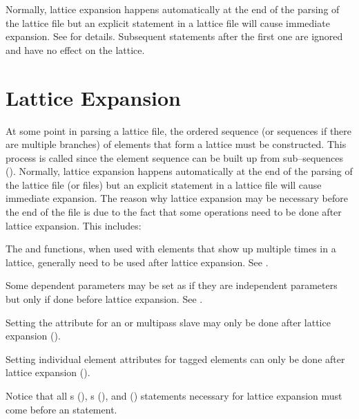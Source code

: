 {{{{{Normally, lattice expansion happens automatically at the end of the parsing of the lattice file but
an explicit  statement in a lattice file will cause immediate expansion. See
 for details. Subsequent  statements after the first one are
ignored and have no effect on the lattice.

\section{Lattice Expansion}
\label{s:expand}

At some point in parsing a lattice file, the ordered sequence (or sequences if there are multiple
branches) of elements that form a lattice must be constructed. This process is called  since the element sequence can be built up from sub--sequences
(). Normally, lattice expansion happens automatically at the end of the parsing of
the lattice file (or files) but an explicit  statement in a lattice file will
cause immediate expansion. The reason why lattice expansion may be necessary before the end of the
file is due to the fact that some operations need to be done after lattice expansion. This includes:
\begin{Itemize}
\item 
{}
The  and  functions, when used with elements
that show up multiple times in a lattice, generally need to be used
after lattice expansion. See .
\item
Some dependent parameters may be set as if they are independent
parameters but only if done before lattice expansion. See .
\item 
Setting the  attribute for an 
 or  multipass
slave may only be done after lattice expansion ().
\item
{}
Setting individual element attributes for tagged elements can only be done
after lattice expansion ().
\end{Itemize}

Notice that all s (), s (), and 
() statements necessary for lattice expansion must come before an 
statement.

}}}}}

